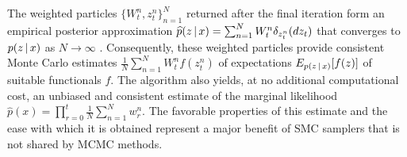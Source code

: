 \documentclass[
  12pt]{article}
\newcommand{\padvert}{\thinspace \vert \thinspace}
\begin{document}
The weighted particles $\{W_t^n, z_t^n\}_{n=1}^N$ returned after the final iteration form an empirical posterior approximation $\widehat{p}(z \padvert x) = \sum_{n=1}^N W_t^n \delta_{z_t^n}(dz_t)$ that converges to $p(z \padvert x)$ as $N \rightarrow \infty$ \citep{chopin2020}. Consequently, these weighted particles provide consistent Monte Carlo estimates $\frac{1}{N} \sum_{n=1}^N W_t^n f(z_t^n)$ of expectations $E_{p(z \padvert x)}[f(z)]$ of suitable functionals $f$. The algorithm also yields, at no additional computational cost, an unbiased and consistent estimate of the marginal likelihood $\widehat{p}(x) = \prod_{r=0}^t \frac{1}{N} \sum_{n=1}^N w_r^n$. The favorable properties of this estimate and the ease with which it is obtained represent a major benefit of SMC samplers that is not shared by MCMC methods.
\end{document}
